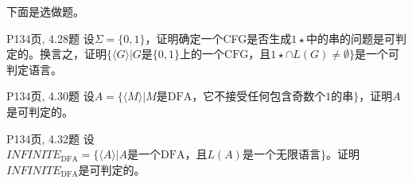 \documentclass[11pt,addpoints,answers]{exam}
\begin{document}
下面是选做题。

\begin{questions}
	
	\question P134页, 4.28题
	设$\Sigma=\{0,1\}$，证明确定一个CFG是否生成$1\star$中的串的问题是可判定的。换言之，证明$\{\langle G\rangle|G\text{是}\{0,1\}\text{上的一个CFG，且}1\star \cap L(G)\neq \emptyset\}$是一个可判定语言。
	\begin{solution}
		
		
	\end{solution}  
	
	\question P134页, 4.30题
	设$A=\{\langle M \rangle|M\text{是DFA，它不接受任何包含奇数个1的串}\}$，证明$A$是可判定的。
	\begin{solution}
		
		
	\end{solution}   
	
	
	\question P134页, 4.32题
	设$INFINITE_\text{DFA}=\{\langle A\rangle|A\text{是一个DFA，且}L(A)\text{是一个无限语言}\}$。证明$INFINITE_\text{DFA}$是可判定的。
	\begin{solution}
		
		
	\end{solution}  
	
	
\end{questions}
 	
\end{document}
